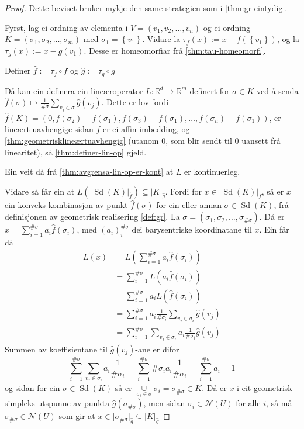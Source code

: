 \documentclass[a4paper, 12pt, norsk]{article}
\theoremstyle{plain}
\theoremstyle{definition}
\newcommand{\Rb}{\mathbb{R}}
\newcommand{\Nc}{\mathcal{N}}
\newcommand{\union}{ \mathop{\cup}\limits }
\newcommand{\gr}[1]{ \lvert #1 \rvert } %
\newcommand{\set}[1]{ \left\{ #1 \right\} } %
\DeclareMathOperator{\Sd}{Sd} %
\begin{document}
\begin{proof}
	Dette beviset bruker mykje den same strategien som i \autoref{thm:gr-eintydig}.

	Fyrst, lag ei ordning av elementa i \( V = (v_1, v_2, \dots, v_n) \) og ei ordning \( K = (\sigma_1, \sigma_2, \dots, \sigma_m) \) med \( \sigma_1 = \set{v_1} \). Vidare la \( \tau_f(x) := x-f(\set{v_1}) \), og la \( \tau_g(x) := x-g(v_1) \). Desse er homeomorfiar frå \autoref{thm:tau-homeomorfi}.

	Definer \( \hat{f} := \tau_f \circ f \) og \( \hat{g} := \tau_g \circ g \)

	Då kan ein definera ein lineæroperator \( L: \Rb^d \to \Rb^m \) definert for \( \sigma \in K \) ved å senda \( \hat{f}(\sigma) \mapsto \frac{1}{\#\sigma}\sum_{v_j \in \sigma} \hat{g}(v_j) \). Dette er lov fordi \( \hat{f}(K) = (0, f(\sigma_2)-f(\sigma_1), f(\sigma_3)-f(\sigma_1), \dots, f(\sigma_n)-f(\sigma_1) ) \), er lineært uavhengige sidan \( f \) er ei affin imbedding, og \autoref{thm:geometrisklineærtuavhengig} (utanom \( 0 \), som blir sendt til \( 0 \) uansett frå linearitet), så \autoref{thm:definer-lin-op} gjeld.

	Ein veit då frå \autoref{thm:avgrensa-lin-op-er-kont} at \( L \) er kontinuerleg. 

	Vidare så får ein at \( L(\gr{\Sd(K)}_{\hat{f}}) \subseteq \gr{K}_{\hat{g}} \). Fordi for \( x \in \gr{\Sd(K)}_{\hat{f}} \), så er \( x \) ein konveks kombinasjon av punkt \( \hat{f}(\sigma) \) for ein eller annan \( \sigma \in \Sd(K) \), frå definisjonen av geometrisk realisering \autoref{def:gr}. La \( \sigma = (\sigma_1, \sigma_2, \dots, \sigma_{\#\sigma}) \). Då er \( x = \sum_{i=1}^{\#\sigma} a_i \hat{f}(\sigma_i) \), med \( (a_i)_i^{\#\sigma} \) dei barysentriske koordinatane til \( x \). Ein får då
	\begin{align*}
		L(x) &= L\left(\sum_{i=1}^{\#\sigma} a_i \hat{f}(\sigma_i)\right) \\
		&= \sum_{i=1}^{\#\sigma} L(a_i \hat{f}(\sigma_i)) \\
		&= \sum_{i=1}^{\#\sigma} a_i L(\hat{f}(\sigma_i)) \\
		&= \sum_{i=1}^{\#\sigma} a_i \frac{1}{\#\sigma_i} \sum_{v_j \in \sigma_i} \hat{g}(v_j) \\
		&= \sum_{i=1}^{\#\sigma} \sum_{v_j \in \sigma_i} a_i \frac{1}{\#\sigma_i} \hat{g}(v_j)
	\end{align*}
	Summen av koeffisientane til \( \hat{g}(v_j) \)-ane er difor
	\[
		\sum_{i=1}^{\#\sigma} \sum_{v_j \in \sigma_i} a_i \frac{1}{\#\sigma_i} = 
		\sum_{i=1}^{\#\sigma} \#\sigma_i a_i \frac{1}{\#\sigma_i} =
		\sum_{i=1}^{\#\sigma} a_i = 1
	\]
	og sidan for ein \( \sigma \in \Sd(K) \) så er \( \union_{\sigma_i \in \sigma} \sigma_i = \sigma_{\#\sigma} \in K \). Då er \( x \) i eit geometrisk simpleks utspunne av punkta \( \hat{g}(\sigma_{\#\sigma}) \), men sidan \( \sigma_i \in \Nc(U) \) for alle \( i \), så må \( \sigma_{\#\sigma} \in \Nc(U) \) som gir at \( x \in \gr{\sigma_{\#\sigma}}_{\hat{g}} \subseteq \gr{K}_{\hat{g}} \)


\end{proof}
\end{document}
